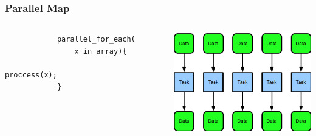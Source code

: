 \documentclass[xcolor=dvipsnames]{beamer}
\begin{document}
		
		\begin{frame}[fragile] \frametitle{Parallel Map}
		\begin{columns}
			\begin{column}{0.5\textwidth}
			\begin{verbatim}
			parallel_for_each(
			    x in array){
				        proccess(x);
			}
			\end{verbatim}
		     \end{column}
  			\begin{column}{0.5\textwidth}
			\includegraphics[width=60mm]{images/map_parallel.png}
		     \end{column}
		\end{columns}
		\end{frame}
		
\end{document}
